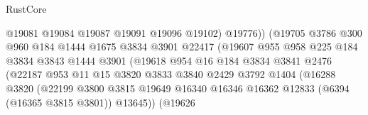 \begin{lexlean}{RustCore}
\begin{coremodule}
                                        @19081
                                        @19084
                                        @19087
                                        @19091
                                        @19096
                                        @19102)
                                      @19776))
                                  (@19705
                                    @3786
                                    @300
                                    @960
                                    @184
                                    @1444
                                    @1675
                                    @3834
                                    @3901
                                    @22417
                                    (@19607
                                      @955
                                      @958
                                      @225
                                      @184
                                      @3834
                                      @3843
                                      @1444
                                      @3901
                                      (@19618
                                        @954
                                        @16
                                        @184
                                        @3834
                                        @3841
                                        @2476
                                        (@22187
                                          @953
                                          @11
                                          @15
                                          @3820
                                          @3833
                                          @3840
                                          @2429
                                          @3792
                                          @1404
                                          (@16288
                                            @3820
                                            (@22199
                                              @3800
                                              @3815
                                              @19649
                                              @16340
                                              @16346
                                              @16362
                                              @12833
                                              (@6394 (@16365 @3815 @3801))
                                              @13645))
                                          (@19626

\end{coremodule}
\end{lexlean}
